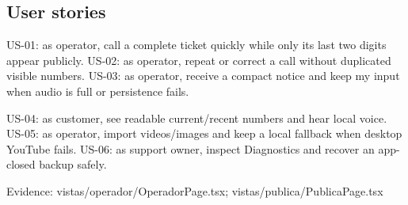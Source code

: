 \subsection{User stories}

US-01: as operator, call a complete ticket quickly while only its last two digits appear publicly. US-02: as operator, repeat or correct a call without duplicated visible numbers. US-03: as operator, receive a compact notice and keep my input when audio is full or persistence fails.

US-04: as customer, see readable current/recent numbers and hear local voice. US-05: as operator, import videos/images and keep a local fallback when desktop YouTube fails. US-06: as support owner, inspect Diagnostics and recover an app-closed backup safely.

Evidence: vistas/operador/OperadorPage.tsx; vistas/publica/PublicaPage.tsx
